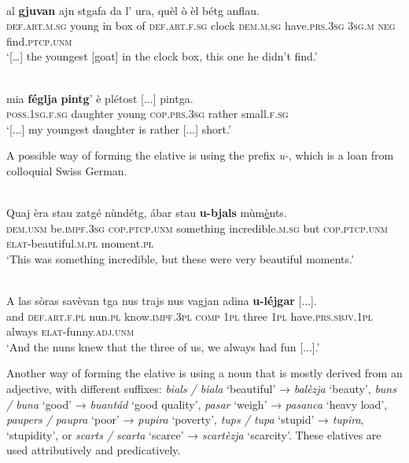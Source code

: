 \ea\label{}
\\
\gll    […] al \textbf{gjuvan} ajn stgafa da l' ura, quèl ò èl bétg anflau.\\
  {} \textsc{def.art.m.sg} young in box of \textsc{def.art.f.sg} clock \textsc{dem.m.sg} have.\textsc{prs.3sg} \textsc{3sg.m} \textsc{neg} find.\textsc{ptcp.unm}\\
\glt `[…] the youngest [goat] in the clock box, this one he didn’t find.'
\z

\ea\label{}
\\
	\gll  [...] mia \textbf{féglja} \textbf{pintg}’ è plétost [...] pintga.   \\
{} \textsc{poss.1sg.f.sg} daughter young \textsc{cop.prs.3sg} rather {} small.\textsc{f.sg}\\
\glt `[...] my youngest daughter is rather [...] short.'
\z

A possible way of forming the elative is using the prefix \textit{u-}, which is a loan from colloquial Swiss German.

\ea\label{}
\\
\gll  Quaj èra stau zatgé nùndétg, ábar stau \textbf{u-bjals} mùm\underline{è}nts.\\
\textsc{dem.unm} be.\textsc{impf.3sg} \textsc{cop.ptcp.unm} something incredible.\textsc{m.sg} but \textsc{cop.ptcp.unm}  \textsc{elat}-beautiful.\textsc{m.pl} moment.\textsc{pl} \\
\glt `This was something incredible, but these were very beautiful moments.'
\z

\ea\label{}
\\
\gll    A las sòras savèvan tga nus trajs nus vagjan adina \textbf{u-léjgar} [...].\\
and \textsc{def.art.f.pl} nun.\textsc{pl} know.\textsc{impf.3pl} \textsc{comp} \textsc{1pl} three \textsc{1pl} have.\textsc{prs.sbjv.1pl} always \textsc{elat}-funny.\textsc{adj.unm}\\
\glt `And the nuns knew that the three of us, we always had fun [...].'
\z

Another way of forming the elative is using a noun that is mostly derived from an adjective, with different suffixes: \textit{bials / biala} `beautiful' → \textit{balèzja} `beauty', \textit{buns / buna} `good' → \textit{buantád} `good quality', \textit{pasar} `weigh' → \textit{pasanca} `heavy load', \textit{paupers / paupra} `poor' → \textit{pupira} `poverty', \textit{tups / tupa} `stupid' → \textit{tupira}, `stupidity', or \textit{scarts / scarta} `scarce' → \textit{scartèzja} `scarcity'. These elatives are used attributively and predicatively.

